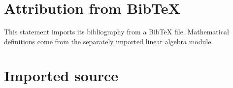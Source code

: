 \documentclass[11pt]{article}
\begin{document}
\par\medskip
\section*{Attribution from BibTeX}
This statement imports its bibliography from a BibTeX file. Mathematical definitions come from the separately imported linear algebra module.

\section*{Imported source}

\end{document}
